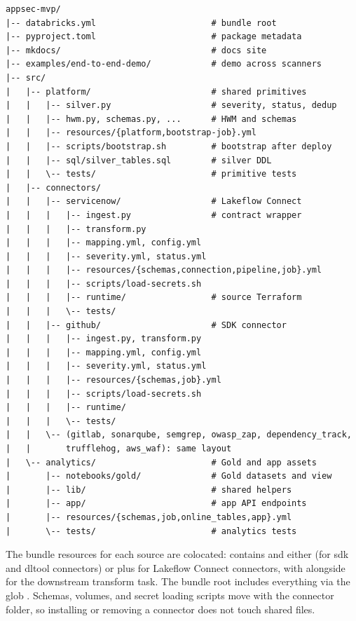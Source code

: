 \begin{lstlisting}[caption={[Realized MVP project layout]Realized MVP project layout. Two connector examples are expanded. The others follow the same layout.},label={lst:mvp-tree}]
appsec-mvp/
|-- databricks.yml                       # bundle root
|-- pyproject.toml                       # package metadata
|-- mkdocs/                              # docs site
|-- examples/end-to-end-demo/            # demo across scanners
|-- src/
|   |-- platform/                        # shared primitives
|   |   |-- silver.py                    # severity, status, dedup
|   |   |-- hwm.py, schemas.py, ...      # HWM and schemas
|   |   |-- resources/{platform,bootstrap-job}.yml
|   |   |-- scripts/bootstrap.sh         # bootstrap after deploy
|   |   |-- sql/silver_tables.sql        # silver DDL
|   |   \-- tests/                       # primitive tests
|   |-- connectors/
|   |   |-- servicenow/                  # Lakeflow Connect
|   |   |   |-- ingest.py                # contract wrapper
|   |   |   |-- transform.py
|   |   |   |-- mapping.yml, config.yml
|   |   |   |-- severity.yml, status.yml
|   |   |   |-- resources/{schemas,connection,pipeline,job}.yml
|   |   |   |-- scripts/load-secrets.sh
|   |   |   |-- runtime/                 # source Terraform
|   |   |   \-- tests/
|   |   |-- github/                      # SDK connector
|   |   |   |-- ingest.py, transform.py
|   |   |   |-- mapping.yml, config.yml
|   |   |   |-- severity.yml, status.yml
|   |   |   |-- resources/{schemas,job}.yml
|   |   |   |-- scripts/load-secrets.sh
|   |   |   |-- runtime/
|   |   |   \-- tests/
|   |   \-- (gitlab, sonarqube, semgrep, owasp_zap, dependency_track,
|   |       trufflehog, aws_waf): same layout
|   \-- analytics/                       # Gold and app assets
|       |-- notebooks/gold/              # Gold datasets and view
|       |-- lib/                         # shared helpers
|       |-- app/                         # app API endpoints
|       |-- resources/{schemas,job,online_tables,app}.yml
|       \-- tests/                       # analytics tests
\end{lstlisting}

The bundle resources for each source are colocated: \allowbreak{} contains  and either  (for \gls{sdk} and \gls{dltool} connectors) or  plus  for Lakeflow Connect connectors, with  alongside for the downstream transform task. The bundle root includes everything via the glob \allowbreak{}\allowbreak{}\allowbreak{}. Schemas, volumes, and secret loading scripts move with the connector folder, so installing or removing a connector does not touch shared files.

